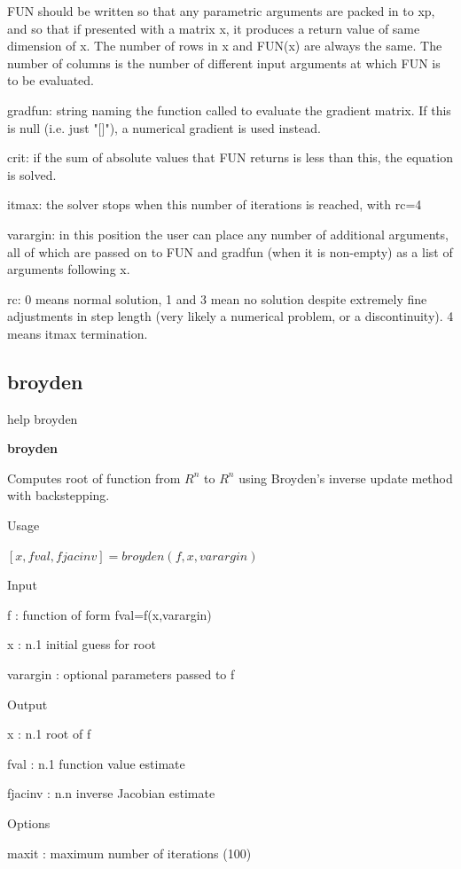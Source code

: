 \documentclass[10pt,math=newtx,citestyle=gb7714-2015,bibstyle=gb7714-2015]{elegantbook}
\begin{document}
{{{	FUN should be written so that any parametric arguments are packed in to xp, and so that if presented with a matrix x, it produces a return value of same dimension of x.  The number of rows in x and FUN(x) are always the same.  The number of columns is the number of different input arguments at which FUN is to be evaluated.
	
	gradfun:  string naming the function called to evaluate the gradient matrix.  If this is null (i.e. just "[]"), a numerical gradient is used instead.
	
	crit:     if the sum of absolute values that FUN returns is less than this, the equation is solved.
	
	itmax:    the solver stops when this number of iterations is reached, with rc=4
	
	varargin: in this position the user can place any number of additional arguments, all of which are passed on to FUN and gradfun (when it is non-empty) as a list of arguments following x.
	
	rc:       0 means normal solution, 1 and 3 mean no solution despite extremely fine adjustments in step length (very likely a numerical problem, or a discontinuity). 4 means itmax termination.
	
	
	\subsection{broyden}
	
	help broyden
	
	\textbf{broyden}
	
	Computes root of function from $R^n$ to $R^n$ using Broyden's inverse update method with backstepping.
	
	Usage
	
	$[x,fval,fjacinv] = broyden(f,x,varargin)$
	
	Input
	
	f         : function of form fval=f(x,varargin)
	
	x         : n.1 initial guess for root
	
	varargin  : optional parameters passed to f
	
	Output
	
	x         : n.1 root of f
	
	fval      : n.1 function value estimate
	
	fjacinv   : n.n inverse Jacobian estimate
	
	Options
	
	maxit     : maximum number of iterations (100)
	
}}}
\end{document}
